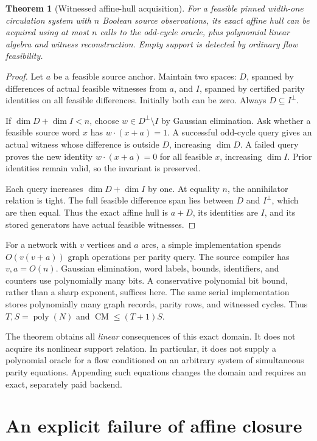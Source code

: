 \documentclass[11pt,letterpaper]{article}
\newtheorem{theorem}{Theorem}
\theoremstyle{definition}
\newcommand{\poly}{\operatorname{poly}}
\newcommand{\CM}{\operatorname{CM}}
\begin{document}
\begin{theorem}[Witnessed affine-hull acquisition]\label{thm:hull}
For a feasible pinned width-one circulation system with $n$ Boolean source observations, its exact affine hull can be acquired using at most $n$ calls to the odd-cycle oracle, plus polynomial linear algebra and witness reconstruction. Empty support is detected by ordinary flow feasibility.
\end{theorem}
\begin{proof}
Let $a$ be a feasible source anchor. Maintain two spaces: $D$, spanned by differences of actual feasible witnesses from $a$, and $I$, spanned by certified parity identities on all feasible differences. Initially both can be zero. Always $D\subseteq I^\perp$.

If $\dim D+\dim I<n$, choose $w\in D^\perp\setminus I$ by Gaussian elimination. Ask whether a feasible source word $x$ has $w\cdot(x+a)=1$. A successful odd-cycle query gives an actual witness whose difference is outside $D$, increasing $\dim D$. A failed query proves the new identity $w\cdot(x+a)=0$ for all feasible $x$, increasing $\dim I$. Prior identities remain valid, so the invariant is preserved.

Each query increases $\dim D+\dim I$ by one. At equality $n$, the annihilator relation is tight. The full feasible difference span lies between $D$ and $I^\perp$, which are then equal. Thus the exact affine hull is $a+D$, its identities are $I$, and its stored generators have actual feasible witnesses.
\end{proof}

For a network with $v$ vertices and $a$ arcs, a simple implementation spends $O(v(v+a))$ graph operations per parity query. The source compiler has $v,a=O(n)$. Gaussian elimination, word labels, bounds, identifiers, and counters use polynomially many bits. A conservative polynomial bit bound, rather than a sharp exponent, suffices here. The same serial implementation stores polynomially many graph records, parity rows, and witnessed cycles. Thus $T,S=\poly(N)$ and $\CM\le(T+1)S$.

The theorem obtains all \emph{linear} consequences of this exact domain. It does not acquire its nonlinear support relation. In particular, it does not supply a polynomial oracle for a flow conditioned on an arbitrary system of simultaneous parity equations. Appending such equations changes the domain and requires an exact, separately paid backend.

\section{An explicit failure of affine closure}\label{sec:counter}
\end{document}
